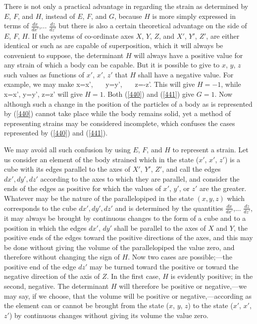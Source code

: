 \documentclass[12pt]{article}
\begin{document}
{There is not only a practical advantage in regarding the strain as determined by $E$, $F$, and $H$, instead of $E$, $F$, and $G$, because $H$ is more simply expressed in terms of $\frac{dx}{dx'}$,... $\frac{dz}{dz'}$ but there is also a certain theoretical advantage on the side of $E$, $F$, $H$. If the systems of co-ordinate axes $X$, $Y$, $Z$, and $X'$, $Y'$, $Z'$, are either identical or such as are capable of superposition, which it will always be convenient to suppose, the determinant $H$ will always have a positive value for any strain of which a body can be capable. But it is possible to give to $x$, $y$, $z$ such values as functions of $x'$, $x'$, $z'$ that $H$ shall have a negative value. For example, we may make
\eqs x=x', \ \ \ y=y', \ \ \ z=-z'.    \label{440}\eqe
This will give $H= -1$, while
\eqs x=x', y=y', z=z'     \label{441}\eqe
will give $H=1$. Both (\ref{440}) and (\ref{441}) give $G=1$. Now although such a change in the position of the particles of a body as is represented by (\ref{440}) cannot take place while the body remains solid, yet a method of representing strains may be considered incomplete, which confuses the cases represented by (\ref{440}) and (\ref{441}).


We may avoid all such confusion by using $E$, $F$, and $H$ to represent a strain. Let us consider an element of the body strained which in the state ($x'$, $x'$, $z'$) is a cube with its edges parallel to the axes of $X'$, $Y'$, $Z'$, and call the edges $dx', dy', dz'$ according to the axes to which they are parallel, and consider the ends of the edges as positive for which the values of $x'$, $y'$, or $z'$ are the greater. Whatever may be the nature of the parallelopiped in the state $(x, y, z)$ which corresponds to the cube $dx', dy', dz'$ and is determined by the quantities $\frac{dx}{dx'}$,... $\frac{dz}{dz'}$, it may always be brought by continuous changes to the form of a cube and to a position in which the edges $dx'$, $dy'$ shall be parallel to the axes of $X$ and $Y$, the positive ends of the edges toward the positive directions of the axes, and this may be done without giving the volume of the parallelopiped the value zero, and therefore without changing the sign of $H$.  Now two cases are possible;---the positive end of the edge $dz'$ may be turned toward the positive or toward the negative direction of the axis of $Z$. In the first case, $H$ is evidently positive; in the second, negative. The determinant $H$ will therefore be positive or negative,---we may say, if we choose, that the volume will be positive or negative,---according as the element can or cannot be brought from the state ($x$, $y$, $z$) to the state ($x'$, $x'$, $z'$) by continuous changes without giving its volume the value zero.


}
\end{document}
